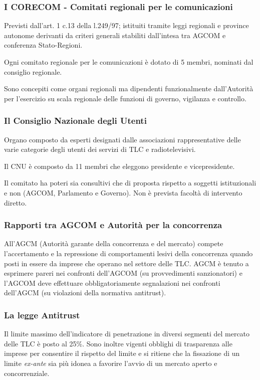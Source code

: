 \subsubsection{I CORECOM - Comitati regionali per le comunicazioni}
Previsti dall'art. 1 c.13 della l.249/97; istituiti tramite leggi regionali e province autonome derivanti da criteri generali stabiliti dall'intesa tra AGCOM e conferenza Stato-Regioni.

Ogni comitato regionale per le comunicazioni è dotato di 5 membri, nominati dal consiglio regionale.

Sono concepiti come organi regionali ma dipendenti funzionalmente dall'Autorità per l'esercizio su scala regionale delle funzioni di governo, vigilanza e controllo.

\subsubsection{Il Consiglio Nazionale degli Utenti}
Organo composto da esperti designati dalle associazioni rappresentative delle varie categorie degli utenti dei servizi di TLC e radiotelevisivi. 

Il CNU è composto da 11 membri che eleggono presidente e vicepresidente. 

Il comitato ha poteri sia consultivi che di proposta rispetto a soggetti istituzionali e non (AGCOM, Parlamento e Governo). Non è prevista facoltà di intervento diretto.

\subsubsection{Rapporti tra AGCOM e Autorità per la concorrenza}
All'AGCM (Autorità garante della concorrenza e del mercato) compete l'accertamento e la repressione di comportamenti lesivi della concorrenza quando posti in essere da imprese che operano nel settore delle TLC.
AGCM è tenuto a esprimere pareri nei confronti dell'AGCOM (su provvedimenti sanzionatori) e l'AGCOM deve effettuare obbligatoriamente segnalazioni nei confronti dell'AGCM (su violazioni della normativa antitrust).

\subsubsection{La legge Antitrust}
Il limite massimo dell'indicatore di penetrazione in diversi segmenti del mercato delle TLC è posto al 25\%. 
Sono inoltre vigenti obblighi di trasparenza alle imprese per consentire il rispetto del limite e si ritiene che la fissazione di un limite \textit{ex-ante} sia più idonea a favorire l'avvio di un mercato aperto e concorrenziale.
